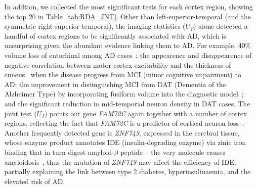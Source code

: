 \documentclass[11pt]{article}
\begin{document}
In addtion, we collected the most siginificant tests for each cortex region, showing the top 20 in Table~\ref{tab:RDA_JNT}. Other than left-superior-temporal (and the symmetric right-superior-temporal), the imaging statistics ($U_V$) alone detected a handful of cortex regions to be significantly associated with AD, which is unsurprising given the abundant evidence linking them to AD. For example, 40\% volume loss of entorhinal among AD cases~\citep{AD:entorhinal}; the appearence and disappearence of negative correlation between motor cortex excitability and the thickness of cuneus~\citep{AD:cuneus} when the disease progress from MCI (minor cognitive impairment) to AD; the improvement in distinguishing MCI from DAT (Dementia of the Alzheimer Type) by incorporating fusiform volume into the diagnostic model~\citep{AD:fusiform}; and the significant reduction in mid-temporial neuron density in DAT cases. The joint test ($U_J$) points out gene \textit{FAM72C} again together with a number of cortex regions, reflecting the fact that \textit{FAM72C} is a predictor of cortical neuron loss~\citep{GN:FAM72C1}. Another frequently detected gene is \textit{ZNF749}, expressed in the cerebral tissue, whose enzyme product annotates IDE (insulin-degrading enzyme) via zinic iron binding that in turn digest amyloid-$\beta$ peptide -- the very molecule causes amyloidosis~\citep{GN:IDE1,GN:IDE2}, thus the mutation of \textit{ZNF749} may affect the efficiency of IDE, partially explaining the link between type 2 diabetes, hyperinsulinaemia, and the elevated risk of AD.
\end{document}
